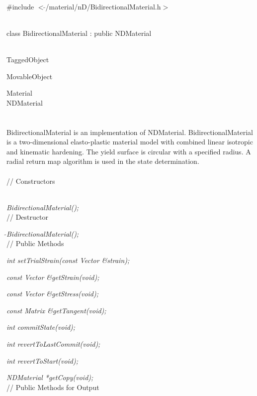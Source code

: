    \\
\#include $<\tilde{ }$/material/nD/BidirectionalMaterial.h$>$  


  \\
class BidirectionalMaterial : public NDMaterial 


 \\
TaggedObject 

MovableObject 

\indent\indent Material \\
\indent\indent\indent NDMaterial \\
\indent\indent\indent{} \\

  \\
\indent BidirectionalMaterial is an implementation of NDMaterial. 
BidirectionalMaterial is a two-dimensional elasto-plastic material model with
combined linear isotropic and kinematic hardening. The yield surface is
circular with a specified radius. A radial return map algorithm is used
in the state determination. \\

 \\
// Constructors 

 \\ 
{\em BidirectionalMaterial();} \\ 

// Destructor 

{\em $\tilde{ }$BidirectionalMaterial();} \\ 

// Public Methods 

{\em int setTrialStrain(const Vector \&strain); } 

{\em const Vector \&getStrain(void); } 

{\em const Vector \&getStress(void); } 

{\em const Matrix \&getTangent(void); } 

{\em int commitState(void); } 

{\em int revertToLastCommit(void); } 

{\em int revertToStart(void); } 

{\em NDMaterial *getCopy(void); } \\ 

// Public Methods for Output

